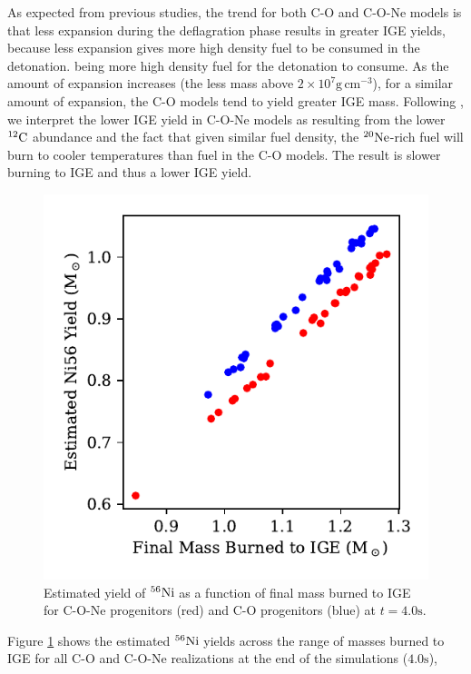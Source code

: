 \documentclass[iop,apj]{emulateapj}
\newcommand{\C}[1]{\ensuremath{{}^{#1}{\rm C}}}
\newcommand{\Ne}[1]{\ensuremath{{}^{#1}{\rm Ne}}}
\newcommand{\Ni}[1]{\ensuremath{{}^{#1}{\rm Ni}}}
\newcommand{\unitspace}{\ensuremath{\,}}
\newcommand{\usp}{\unitspace}
\newcommand{\unitstyle}[1]{\ensuremath{\mathrm{#1}}}
\newcommand{\power}[2]{\ensuremath{{#1}^{#2}}}
\newcommand{\centi}{\unitstyle{c}}
\newcommand{\meter}{\unitstyle{m}}
\newcommand{\second}{\unitstyle{s}}
\newcommand{\cm}{\centi\meter}
\newcommand{\gram}{\unitstyle{g}}
\newcommand{\grampercc}{\gram\usp\power{\cm}{-3}} %
\begin{document}
As expected from previous studies, the trend for both C-O and C-O-Ne
models is that less expansion during the deflagration phase results in
greater IGE yields, because less expansion gives more high
density fuel to be consumed in the detonation.
being more high density fuel for the detonation to consume. 
As the amount of expansion increases (the less
mass above $2 \times 10^7 \grampercc$), 
for a similar amount of expansion, the C-O
models tend to yield greater IGE mass. Following 
\citet{willcoxetal2016}, we interpret
the lower IGE yield in C-O-Ne models as resulting 
from the lower \C{12} abundance and the fact that given
similar fuel density, the \Ne{20}-rich fuel will burn to cooler
temperatures than fuel in the C-O models. The result is
slower burning to IGE and thus a lower IGE yield.

\begin{figure}
\includegraphics[width=\columnwidth]{figures/FMBTI_v_Ni56Yield_plot.pdf}
\caption{\label{fig:conversion}
Estimated yield of \Ni{56} as a function of final mass burned to IGE
for C-O-Ne progenitors (red) and C-O progenitors (blue) at
$t = 4.0 \second$.
}
\end{figure}
Figure \ref{fig:conversion} shows the estimated \Ni{56} yields 
across the range of masses burned to IGE
for all C-O and C-O-Ne realizations at the end 
of the simulations ($4.0 \second$),
\end{document}
